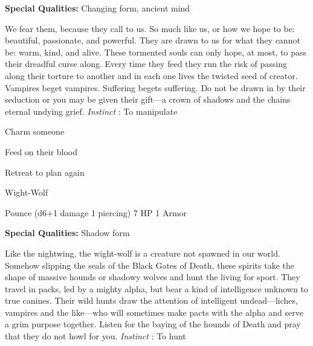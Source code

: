        
\startMonsterQualities
         {\bf Special Qualities:}  Changing form, ancient mind
\stopMonsterQualities
       
\startMonsterDescription
We fear them, because they call to us.  So much like us, or how we hope to be: beautiful, passionate, and powerful.  They are drawn to us for what they cannot be: warm, kind, and alive.  These tormented souls can only hope, at most, to pass their dreadful curse along.  Every time they feed they run the risk of passing along their torture to another and in each one lives the twisted seed of creator.  Vampires beget vampires.  Suffering begets suffering.  Do not be drawn in by their seduction or you may be given their gift—a crown of shadows and the chains eternal undying grief. {\em Instinct} : To manipulate
\stopMonsterDescription
       
\startitemize[1,packed]
         
\item Charm someone

         
\item Feed on their blood

         
\item Retreat to plan again

       
\stopitemize
       
\startMonsterName
Wight-Wolf	 
\stopMonsterName
       

Pounce (d6+1 damage 1 piercing)	7 HP	1 Armor

       


       
\startMonsterQualities
         {\bf Special Qualities:}  Shadow form
\stopMonsterQualities
       
\startMonsterDescription
Like the nightwing, the wight-wolf is a creature not spawned in our world.  Somehow slipping the seals of the Black Gates of Death, these spirits take the shape of massive hounds or shadowy wolves and hunt the living for sport.  They travel in packs, led by a mighty alpha, but bear a kind of intelligence unknown to true canines.  Their wild hunts draw the attention of intelligent undead—liches, vampires and the like—who will sometimes make pacts with the alpha and serve a grim purpose together.  Listen for the baying of the hounds of Death and pray that they do not howl for you. {\em Instinct} : To hunt
\stopMonsterDescription
       
\startitemize[1,packed]
         
